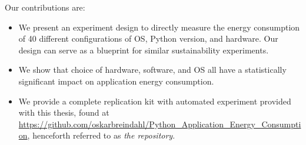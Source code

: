 Our contributions are:
\begin{itemize}[label={-}]
    \item We present an experiment design to directly measure the energy consumption of 40 different configurations of OS, Python version, and hardware. Our design can serve as a blueprint for similar sustainability experiments.
    \item We show that choice of hardware, software, and OS all have a statistically significant impact on application energy consumption.
    \item We provide a complete replication kit with automated experiment provided with this thesis, found at \url{https://github.com/oskarbreindahl/Python_Application_Energy_Consumption}, henceforth referred to as \textit{the repository}.
\end{itemize}
\newpage
